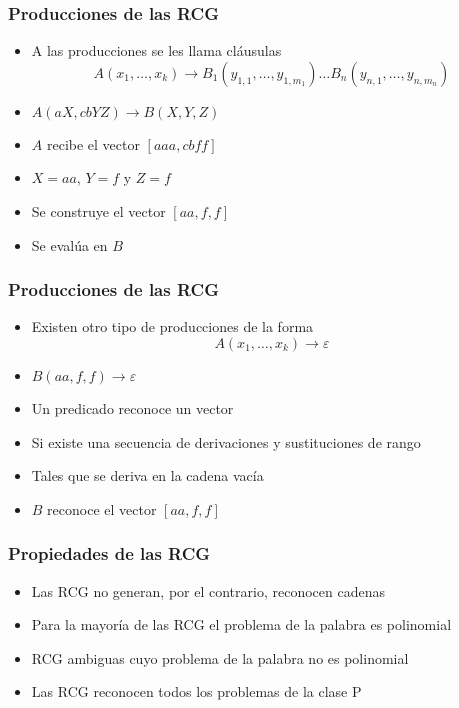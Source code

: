 \documentclass{beamer}
\begin{document}
\begin{frame}
    \frametitle{Producciones de las RCG}

    \begin{itemize}
        \item A las producciones se les llama cláusulas
              \[
                  A(x_1, \ldots, x_k) \to B_1(y_{1,1}, \ldots, y_{1,m_1}) \ldots B_n(y_{n,1}, \ldots, y_{n,m_n})
              \]
              \pause
        \item $A(aX,cbYZ)\to B(X,Y,Z)$
              \pause
        \item $A$ recibe el vector $[aaa,cbff]$
              \pause
        \item $X=aa$, $Y=f$ y $Z=f$
              \pause
        \item Se construye el vector $[aa,f,f]$
              \pause
        \item Se evalúa en $B$
    \end{itemize}
\end{frame}

\begin{frame}
    \frametitle{Producciones de las RCG}

    \begin{itemize}
        \item Existen otro tipo de producciones de la forma
              $$A(x_1, \ldots, x_k) \to \varepsilon$$
              \pause
        \item $B(aa,f,f)\to \varepsilon$
              \pause
        \item Un predicado reconoce un vector
              \pause
        \item Si existe una secuencia de derivaciones y sustituciones de rango
              \pause
        \item Tales que se deriva en la cadena vacía
              \pause
        \item $B$ reconoce el vector $[aa,f,f]$
    \end{itemize}
\end{frame}


\begin{frame}
    \frametitle{Propiedades de las RCG}

    \begin{itemize}
        \item Las RCG no generan, por el contrario, reconocen cadenas
              \pause
        \item Para la mayoría de las RCG el problema de la palabra es polinomial
              \pause
        \item RCG ambiguas cuyo problema de la palabra no es polinomial
              \pause
        \item Las RCG reconocen todos los problemas de la clase P

    \end{itemize}
\end{frame}
\end{document}
